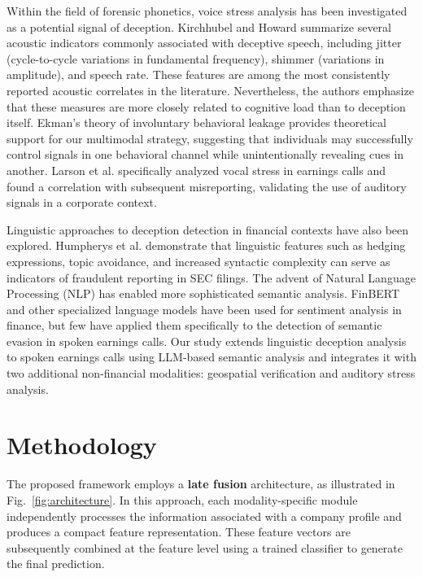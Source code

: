 \documentclass[conference]{IEEEtran}
\begin{document}
Within the field of forensic phonetics, voice stress analysis has been
investigated as a potential signal of deception. Kirchhubel and Howard \cite{kirchhubel2013}
summarize several acoustic indicators commonly associated with deceptive
speech, including jitter (cycle-to-cycle variations in fundamental
frequency), shimmer (variations in amplitude), and speech rate. These
features are among the most consistently reported acoustic correlates in the
literature. Nevertheless, the authors emphasize that these measures are more
closely related to cognitive load than to deception itself. Ekman's theory of
involuntary behavioral leakage \cite{ekman1991} provides theoretical support for our
multimodal strategy, suggesting that individuals may successfully control
signals in one behavioral channel while unintentionally revealing cues in
another. Larson et al. \cite{larson2021} specifically analyzed vocal stress in earnings calls and found a correlation with subsequent misreporting, validating the use of auditory signals in a corporate context.

Linguistic approaches to deception detection in financial contexts have also
been explored. Humpherys et al. \cite{humpherys2011} demonstrate that linguistic features such as
hedging expressions, topic avoidance, and increased syntactic complexity can
serve as indicators of fraudulent reporting in SEC filings. The advent of Natural Language Processing (NLP) has enabled more sophisticated semantic analysis. FinBERT \cite{yang2020} and other specialized language models have been used for sentiment analysis in finance, but few have applied them specifically to the detection of semantic evasion in spoken earnings calls. Our study extends linguistic deception analysis to spoken
earnings calls using LLM-based semantic analysis and integrates it with two
additional non-financial modalities: geospatial verification and auditory
stress analysis.

\section{Methodology}

The proposed framework employs a \textbf{late fusion} architecture, as illustrated in Fig.~\ref{fig:architecture}. In this approach, each modality-specific module independently processes the information associated with a company profile and produces a compact feature representation. These feature vectors are subsequently combined at the feature level using a trained classifier to generate the final prediction.
\end{document}
